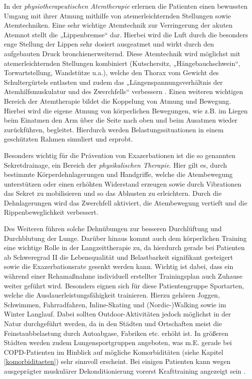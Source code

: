 In der \emph{physiotherapeutischen Atemtherapie} erlernen die Patienten einen bewussten Umgang mit ihrer Atmung mithilfe von atemerleichternden Stellungen sowie Atemtechniken. Eine sehr wichtige Atemtechnik zur Verringerung der akuten Atemnot stellt die „Lippenbremse“ dar. Hierbei wird die Luft durch die besonders enge Stellung der Lippen sehr dosiert ausgeatmet und wirkt durch den aufgebauten Druck bronchienerweiternd. Diese Atemtechnik wird möglichst mit atemerleichternden Stellungen kombiniert (Kutschersitz, „Hängebauchschwein“, Torwartstellung, Wandstütze u.a.), welche den Thorax vom Gewicht des Schultergürtels entlasten und zudem das „Längenspannungsverhältnis der Atemhilfsmuskulatur und des Zwerchfells“ verbessern \autocite[vgl.][291]{lang2007}. Einen weiteren wichtigen Bereich der Atemtherapie bildet die Koppelung von Atmung und Bewegung. Hierbei wird die eigene Atmung von körperlichen Bewegungen, wie z.B. im Liegen beim Einatmen den Arm über die Seite nach oben und beim Ausatmen wieder zurückführen, begleitet. Hierdurch werden Belastungssituationen in einem geschützten Rahmen simuliert und erprobt.

Besonders wichtig für die Prävention von Exazerbationen ist die so genannten Sekretdrainage, ein Bereich der \emph{physikalischen Therapie}. Hier gilt es, durch bestimmte Körperdehnlagerungen und Handgriffe, welche die Atembewegung unterstützen oder einen erhöhten Widerstand erzeugen sowie durch Vibrationen das Sekret zu mobilisieren und so das Abhusten zu erleichtern. Durch die Dehnlagerungen wird das Zwerchfell aktiviert, die Atembewegung vertieft und die Rippenbeweglichkeit verbessert.

Des Weiteren führen solche Dehnübungen zur besseren Durchlüftung und Durchblutung der Lunge. 
Darüber hinaus kommt auch dem körperlichen Training eine wichtige Rolle in der Langzeittherapie zu, da hierdurch gerade bei Patienten ab Schweregrad II die Lebensqualität und Belastbarkeit signifikant gesteigert sowie die Exazerbationsrate gesenkt werden kann. Wichtig ist dabei, dass ein während einer Rehamaßnahme individuell erstellter Trainingsplan auch Zuhause weiter geführt wird. Besonders eignen sich für diese Patientengruppe Sportarten, welche die Ausdauerleistungsfähigkeit trainieren. Hierzu gehören Joggen, Schwimmen, Fahrradfahren, Inline-Skating und (Nordic-)Walking sowie im Winter Langlauf. Dabei sollten Outdoor-Aktivitäten jedoch möglichst in der Natur durchgeführt werden, da in den Städten und Ortschaften meist die Feinstaubbelastung durch Autoabgase, Fabriken etc. erhöht ist. In größeren Städten werden zudem Lungensportgruppen angeboten, was m.E. gerade bei COPD-Patienten im Hinblick auf mögliche Komorbiditäten (siehe Kapitel \ref{komorbiditaeten}) sehr sinnvoll erscheint. Bei einigen Patienten kann wegen ausgeprägter muskulärer Dekonditionierung vorerst Krafttraining angezeigt sein \autocite[vgl.][291f]{lang2007}.


